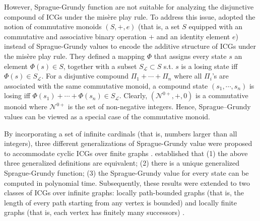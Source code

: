 \documentclass[review]{elsarticle}
\newcommand{\intNum}{\mathcal{N}}
\newcommand{\loseSet}{\mathcal{L}}
\begin{document}
However, Sprague-Grundy function are not suitable for analyzing the disjunctive compound of ICGs under the mis\`{e}re play rule.
To address this issue, \citet{PlaS2008} adopted the notion of commutative monoids $(S, +, e)$ (that is, a set $S$ equipped with an commutative and associative binary operation $+$ and an identity element $e$) instead of Sprague-Grundy values to encode the additive structure of ICGs under the mis\`{e}re play rule.
They defined a mapping $\Phi$ that assigns every state $s$ an element $\Phi(s) \in S$, together with a subset $S_{\loseSet} \subset S$ s.t. $s$ is a losing state iff $\Phi(s) \in S_{\loseSet}$.
For a disjuntive compound $\Pi_1 + \cdots + \Pi_n$ where all $\Pi_i$'s are associated with the same commutative monoid, a compound state $(s_1, \cdots, s_n)$ is losing iff $\Phi(s_1) + \cdots + \Phi(s_n) \in S_{\loseSet}$.
Clearly, $(\intNum^{0+}, +, 0)$ is a commutative monoid where $\intNum^{0+}$ is the set of non-negative integers.
Hence, Sprague--Grundy values can be viewed as a special case of the commutative monoid.

By incorporating a set of infinite cardinals (that is, numbers larger than all integers), three different generalizations of Sprague-Grundy value were proposed to accommodate cyclic ICGs over finite graphs \cite{Smith1966,FraP1975,FraT1975,Con1976,FraY1982}.
\citet{FraY1986} established that (1) the above three generalized definitions are equivalent; (2) there is a unique generalized Sprague-Grundy function; (3) the Sprague-Grundy value for every state can be computed in polynomial time.
Subsequently, these results were extended to two classes of ICGs over infinite graphs: locally path-bounded graphs (that is, the length of every path starting from any vertex is bounded) \cite{FraR2001} and locally finite graphs (that is, each vertex has finitely many successors) \cite{Mar2021}.

\end{document}
